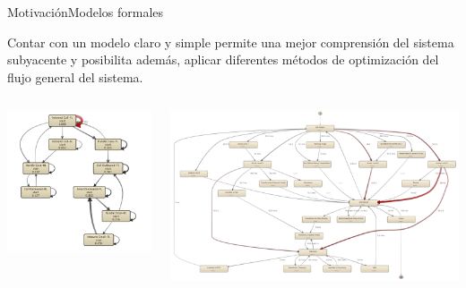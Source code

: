 \documentclass[spanish,pdf]{beamer}
\begin{document}
\begin{frame}{Motivación}{Modelos formales}
  \vspace*{-0.5cm}
  \begin{minipage}[c][0.4\textheight][c]{\linewidth}
    Contar con un modelo claro y simple permite una mejor comprensión del sistema 
    subyacente y posibilita además, aplicar diferentes métodos de optimización
    del flujo general del sistema.
  \end{minipage}
  \begin{columns}
  \pause 
      \begin{minipage}[c][0.3\textheight][c]{\linewidth}
        \centering
        \includegraphics[width=1.2\linewidth]{img/ejemplo1.png}
      \end{minipage}
  \pause 
      \begin{minipage}[c][0.3\textheight][c]{\linewidth}
        \centering
        \includegraphics[width=1.2\linewidth]{img/ejemplo2.png}

\end{minipage}
\end{columns}
\end{frame}
\end{document}
